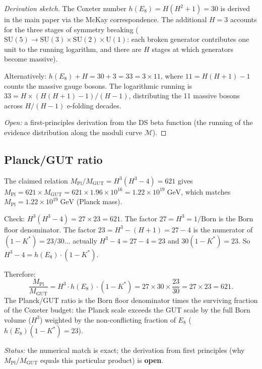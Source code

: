 \documentclass[11pt,a4paper]{article}
\theoremstyle{definition}
\theoremstyle{remark}
\newcommand{\SU}{\mathrm{SU}}
\newcommand{\U}{\mathrm{U}}
\newcommand{\Born}{\mathrm{Born}}
\begin{document}
\begin{proof}[Derivation sketch]
The Coxeter number $h(E_8) = H(H^2+1) = 30$ is derived in the main paper via the McKay correspondence. The additional $H = 3$ accounts for the three stages of symmetry breaking ($\SU(5) \to \SU(3) \times \SU(2) \times \U(1)$: each broken generator contributes one unit to the running logarithm, and there are $H$ stages at which generators become massive).

Alternatively: $h(E_8) + H = 30 + 3 = 33 = 3 \times 11$, where $11 = H(H+1) - 1$ counts the massive gauge bosons. The logarithmic running is $33 = H \times (H(H+1)-1)/(H-1)$, distributing the 11 massive bosons across $H/(H-1)$ e-folding decades.

\emph{Open:} a first-principles derivation from the DS beta function (the running of the evidence distribution along the moduli curve $\mathcal{M}$).
\end{proof}


\subsection{Planck/GUT ratio}\label{sec:planck_gut}

The claimed relation $M_{\mathrm{Pl}}/M_{\mathrm{GUT}} = H^3(H^3-4) = 621$ gives $M_{\mathrm{Pl}} = 621 \times M_{\mathrm{GUT}} = 621 \times 1.96 \times 10^{16} = 1.22 \times 10^{19}\;\mathrm{GeV}$, which matches $M_{\mathrm{Pl}} = 1.22 \times 10^{19}\;\mathrm{GeV}$ (Planck mass).

Check: $H^3(H^3-4) = 27 \times 23 = 621$. The factor $27 = H^3 = 1/\Born$ is the Born floor denominator. The factor $23 = H^3 - (H+1) = 27 - 4$ is the numerator of $(1-K^*) = 23/30$... actually $H^3 - 4 = 27 - 4 = 23$ and $30(1-K^*) = 23$. So $H^3 - 4 = h(E_8) \cdot (1-K^*)$.

Therefore:
\[
\frac{M_{\mathrm{Pl}}}{M_{\mathrm{GUT}}} = H^3 \cdot h(E_8) \cdot (1-K^*) = 27 \times 30 \times \frac{23}{30} = 27 \times 23 = 621.
\]
The Planck/GUT ratio is the Born floor denominator times the surviving fraction of the Coxeter budget: the Planck scale exceeds the GUT scale by the full Born volume ($H^3$) weighted by the non-conflicting fraction of $E_8$ ($h(E_8)(1-K^*) = 23$).

\emph{Status:} the numerical match is exact; the derivation from first principles (why $M_{\mathrm{Pl}}/M_{\mathrm{GUT}}$ equals this particular product) is \textbf{open}.


\end{document}

